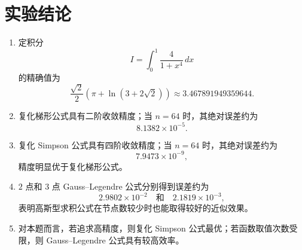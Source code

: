 \documentclass[12pt,a4paper]{ctexart}
\begin{document}
\section{实验结论}

\begin{enumerate}
    \item 定积分
    \[
    I=\int_0^1 \frac{4}{1+x^4}\,dx
    \]
    的精确值为
    \[
    \frac{\sqrt{2}}{2}\left(\pi+\ln(3+2\sqrt{2})\right)
    \approx 3.467891949359644.
    \]
    \item 复化梯形公式具有二阶收敛精度；当 $n=64$ 时，其绝对误差约为
    \[
    8.1382\times 10^{-5}.
    \]
    \item 复化 Simpson 公式具有四阶收敛精度；当 $n=64$ 时，其绝对误差约为
    \[
    7.9473\times 10^{-9},
    \]
    精度明显优于复化梯形公式。
    \item $2$ 点和 $3$ 点 Gauss--Legendre 公式分别得到误差约为
    \[
    2.9802\times 10^{-2}
    \quad \text{和} \quad
    2.1819\times 10^{-3},
    \]
    表明高斯型求积公式在节点数较少时也能取得较好的近似效果。
    \item 对本题而言，若追求高精度，则复化 Simpson 公式最优；若函数取值次数受限，则 Gauss--Legendre 公式具有较高效率。
\end{enumerate}
\end{document}
